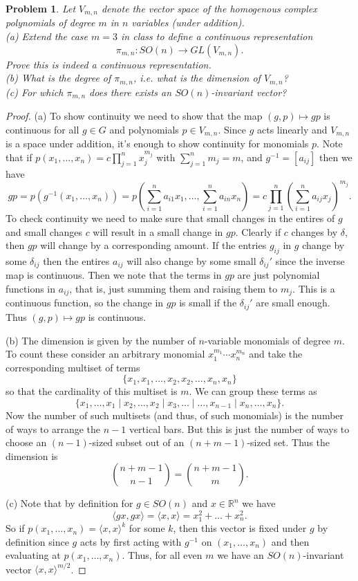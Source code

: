 \documentclass{article}
\newtheorem{problem}{Problem}
\begin{document}
\begin{problem}
Let $V_{m,n}$ denote the vector space of the homogenous complex polynomials of degree $m$ in $n$ variables (under addition).\\
(a) Extend the case $m = 3$ in class to define a continuous representation
\[
\pi_{m,n} : SO(n) \to GL(V_{m,n}).
\]
Prove this is indeed a continuous representation.\\
(b) What is the degree of $\pi_{m,n}$, i.e. what is the dimension of $V_{m,n}$?\\
(c) For which $\pi_{m,n}$ does there exists an $SO(n)$-invariant vector?
\end{problem}
\begin{proof}
(a) To show continuity we need to show that the map $(g,p) \mapsto gp$ is continuous for all $g \in G$ and polynomials $p \in V_{m,n}$. Since $g$ acts linearly and $V_{m,n}$ is a space under addition, it's enough to show continuity for monomials $p$. Note that if $p(x_1, \dots , x_n) = c\prod_{j=1}^n x_j^{m_j}$ with $\sum_{j=1}^n m_j = m$, and $g^{-1} = [a_{ij}]$ then we have
\[
gp = p(g^{-1}(x_1, \dots , x_n)) = p \left (\sum_{i=1}^n a_{i1}x_1, \dots , \sum_{i=1}^n a_{in}x_n \right ) = c\prod_{j=1}^n \left ( \sum_{i=1}^n a_{ij} x_j \right)^{m_j}.
\]
To check continuity we need to make sure that small changes in the entires of $g$ and small changes $c$ will result in a small change in $gp$. Clearly if $c$ changes by $\delta$, then $gp$ will change by a corresponding amount. If the entries $g_{ij}$ in $g$ change by some $\delta_{ij}$ then the entires $a_{ij}$ will also change by some small $\delta_{ij}'$ since the inverse map is continuous. Then we note that the terms in $gp$ are just polynomial functions in $a_{ij}$, that is, just summing them and raising them to $m_j$. This is a continuous function, so the change in $gp$ is small if the $\delta_{ij}'$ are small enough. Thus $(g,p) \mapsto gp$ is continuous.

(b) The dimension is given by the number of $n$-variable monomials of degree $m$. To count these consider an arbitrary monomial $x_1^{m_1} \cdots x_n^{m_n}$ and take the corresponding multiset of terms
\[
\{x_1, x_1, \dots , x_2, x_2, \dots , x_n, x_n \}
\]
so that the cardinality of this multiset is $m$. We can group these terms as
\[
\{x_1, \dots , x_1 \mid x_2, \dots , x_2 \mid x_3, \ldots \mid \dots , x_{n-1} \mid x_n, \dots , x_n \}.
\]
Now the number of such multisets (and thus, of such monomials) is the number of ways to arrange the $n-1$ vertical bars. But this is just the number of ways to choose an $(n-1)$-sized subset out of an $(n + m - 1)$-sized set. Thus the dimension is
\[
\binom{n+m-1}{n-1} = \binom{n+m-1}{m}.
\]

(c) Note that by definition for $g \in SO(n)$ and $x \in \mathbb{R}^n$ we have
\[
\langle gx, gx \rangle = \langle x, x \rangle = x_1^2 + \dots + x_n^2.
\]
So if $p(x_1, \dots , x_n) = \langle x,x \rangle^k$ for some $k$, then this vector is fixed under $g$ by definition since $g$ acts by first acting with $g^{-1}$ on $(x_1, \dots , x_n)$ and then evaluating at $p(x_1, \dots , x_n)$. Thus, for all even $m$ we have an $SO(n)$-invariant vector $\langle x, x \rangle^{m/2}$.
\end{proof}
\end{document}
